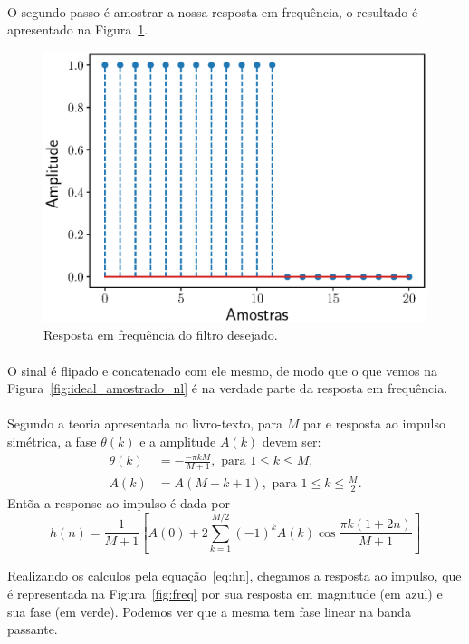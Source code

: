 \documentclass{homeworkclass}
\begin{document}
\begin{homeworkProblem}
\begin{homeworkSection}
\paragraph{}O segundo passo é amostrar a nossa resposta em frequência, o resultado é apresentado na Figura~\ref{fig:ideal_amostrado}.

\begin{figure}[!ht]
	\centering
	\includegraphics[width=0.55\linewidth]{figs/ideal_amostrado}
	\caption{Resposta em frequência do filtro desejado.}
	\label{fig:ideal_amostrado}
\end{figure}

\paragraph{}O sinal é flipado e concatenado com ele mesmo, de modo que o que vemos na Figura~\ref{fig:ideal_amostrado_nl} é na verdade parte da resposta em frequência.


\paragraph{}Segundo a teoria apresentada no livro-texto, para $M$ par e resposta ao impulso simétrica, a fase $\theta(k)$ e a amplitude $A(k)$ devem ser:
\begin{align*}
	\theta(k) &= - \frac{- \pi k M}{M+1}, \, \, \textrm{para} \, \, 1 \leq k \leq M, \\
	A(k) &= A(M-k+1), \, \, \textrm{para} \, \, 1 \leq k \leq \frac{M}{2}.
\end{align*}
Entõa a response ao impulso é dada por 
\begin{equation}\label{eq:hn}
h(n) = \frac{1}{M+1}\left[A(0) + 2\sum_{k=1}^{M/2}(-1)^{k}A(k)\cos\frac{\pi k(1+ 2n)}{M+1}\right]
\end{equation}

Realizando os calculos pela equação~\eqref{eq:hn}, chegamos a resposta ao impulso, que é representada na Figura~\ref{fig:freq} por sua resposta em magnitude (em azul) e sua fase (em verde). Podemos ver que a mesma tem fase linear na banda passante.


\end{homeworkSection}
\end{homeworkProblem}
\end{document}
